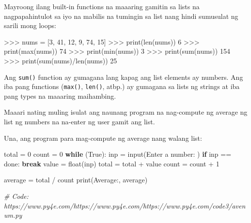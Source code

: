 \documentclass[10pt,]{book}
\newenvironment{Shaded}{}{}
\newcommand{\BuiltInTok}[1]{\textcolor[rgb]{0.00,0.50,0.00}{#1}}
\newcommand{\CommentTok}[1]{\textcolor[rgb]{0.38,0.63,0.69}{\textit{#1}}}
\newcommand{\ControlFlowTok}[1]{\textcolor[rgb]{0.00,0.44,0.13}{\textbf{#1}}}
\newcommand{\DecValTok}[1]{\textcolor[rgb]{0.25,0.63,0.44}{#1}}
\newcommand{\NormalTok}[1]{#1}
\newcommand{\OperatorTok}[1]{\textcolor[rgb]{0.40,0.40,0.40}{#1}}
\newcommand{\StringTok}[1]{\textcolor[rgb]{0.25,0.44,0.63}{#1}}
\newcommand{\VariableTok}[1]{\textcolor[rgb]{0.10,0.09,0.49}{#1}}
\begin{document}
Mayroong ilang built-in functions na maaaring gamitin sa lists na
nagpapahintulot sa iyo na mabilis na tumingin sa list nang hindi
sumusulat ng sarili mong loops:

\begin{Shaded}
\begin{Highlighting}[]
\OperatorTok{\textgreater{}\textgreater{}\textgreater{}}\NormalTok{ nums }\OperatorTok{=}\NormalTok{ [}\DecValTok{3}\NormalTok{, }\DecValTok{41}\NormalTok{, }\DecValTok{12}\NormalTok{, }\DecValTok{9}\NormalTok{, }\DecValTok{74}\NormalTok{, }\DecValTok{15}\NormalTok{]}
\OperatorTok{\textgreater{}\textgreater{}\textgreater{}} \BuiltInTok{print}\NormalTok{(}\BuiltInTok{len}\NormalTok{(nums))}
\DecValTok{6}
\OperatorTok{\textgreater{}\textgreater{}\textgreater{}} \BuiltInTok{print}\NormalTok{(}\BuiltInTok{max}\NormalTok{(nums))}
\DecValTok{74}
\OperatorTok{\textgreater{}\textgreater{}\textgreater{}} \BuiltInTok{print}\NormalTok{(}\BuiltInTok{min}\NormalTok{(nums))}
\DecValTok{3}
\OperatorTok{\textgreater{}\textgreater{}\textgreater{}} \BuiltInTok{print}\NormalTok{(}\BuiltInTok{sum}\NormalTok{(nums))}
\DecValTok{154}
\OperatorTok{\textgreater{}\textgreater{}\textgreater{}} \BuiltInTok{print}\NormalTok{(}\BuiltInTok{sum}\NormalTok{(nums)}\OperatorTok{/}\BuiltInTok{len}\NormalTok{(nums))}
\DecValTok{25}
\end{Highlighting}
\end{Shaded}

Ang \texttt{sum()} function ay gumagana lang kapag ang list elements ay
numbers. Ang iba pang functions (\texttt{max()}, \texttt{len()}, atbp.)
ay gumagana sa lists ng strings at iba pang types na maaaring
maihambing.

Maaari nating muling isulat ang naunang program na nag-compute ng
average ng list ng numbers na na-enter ng user gamit ang list.

Una, ang program para mag-compute ng average nang walang list:

\begin{Shaded}
\begin{Highlighting}[]
\NormalTok{total }\OperatorTok{=} \DecValTok{0}
\NormalTok{count }\OperatorTok{=} \DecValTok{0}
\ControlFlowTok{while}\NormalTok{ (}\VariableTok{True}\NormalTok{):}
\NormalTok{    inp }\OperatorTok{=} \BuiltInTok{input}\NormalTok{(}\StringTok{\textquotesingle{}Enter a number: \textquotesingle{}}\NormalTok{)}
    \ControlFlowTok{if}\NormalTok{ inp }\OperatorTok{==} \StringTok{\textquotesingle{}done\textquotesingle{}}\NormalTok{: }\ControlFlowTok{break}
\NormalTok{    value }\OperatorTok{=} \BuiltInTok{float}\NormalTok{(inp)}
\NormalTok{    total }\OperatorTok{=}\NormalTok{ total }\OperatorTok{+}\NormalTok{ value}
\NormalTok{    count }\OperatorTok{=}\NormalTok{ count }\OperatorTok{+} \DecValTok{1}

\NormalTok{average }\OperatorTok{=}\NormalTok{ total }\OperatorTok{/}\NormalTok{ count}
\BuiltInTok{print}\NormalTok{(}\StringTok{\textquotesingle{}Average:\textquotesingle{}}\NormalTok{, average)}

\CommentTok{\# Code: https://www.py4e.com/https://www.py4e.com/https://www.py4e.com/code3/avenum.py}
\end{Highlighting}
\end{Shaded}
\end{document}
